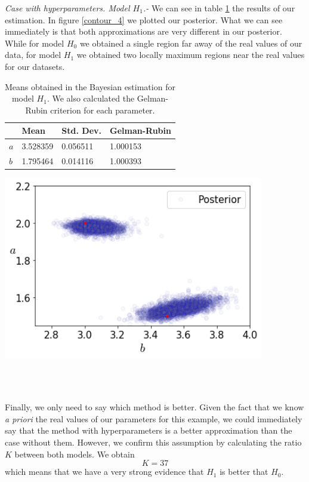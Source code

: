 \documentclass[onecolumn,           %
               showpacs,            %
               preprintnumbers,     %
               aps,                 %
               prl,          	    %
               letterpaper,             %
               superscriptaddress,      %
               nofootinbib,         %
               tightenlines,        %
               floats,floatfix      %
               ,usenatbib,
               ]{revtex4-1}
\begin{document}
\textit{Case with hyperparameters. Model $H_1$.-} We can see in table \ref{tab3} the results of our estimation. In figure \ref{contour_4} we plotted our posterior. What we can see immediately is that both approximations are very different in our posterior. While for model $H_0$ we obtained a single region far away of the real values of our data, for model $H_1$ we obtained two locally maximum regions near the real values for our datasets.  

\begin{table}[h!]
\centering
\begin{tabular}{||l|l|l|l||} 
 \hline
 & \textbf{Mean} & \textbf{Std. Dev.} & \textbf{Gelman-Rubin} \\ [0.5ex] 
 \hline\hline
$a$ & 3.528359 	 & 0.056511 & 1.000153 \\
\hline
$b$ & 1.795464 & 0.014116 	 	 & 1.000393\\ [1ex] 
 \hline
\end{tabular}
\caption{\footnotesize{Means obtained in the Bayesian estimation for model $H_1$. We also calculated the Gelman-Rubin criterion for each parameter.}}
\label{tab3}
\end{table}

\begin{minipage}{\textwidth}
\centering
\includegraphics[height=8cm]{Figures/contour_4.png}
\label{contour_4}
\end{minipage}\\ $ $

Finally, we only need to say which method is better. Given the fact that we know \textit{a priori} the real values of our parameters for this example, we could immediately say that the method with hyperparameters is a better approximation than the case without them. However, we confirm this assumption by calculating the ratio $K$ between both models. We obtain
\begin{equation}
K = 37
\end{equation}
which means that we have a very strong evidence that $H_1$ is better that $H_0$.
\end{document}
